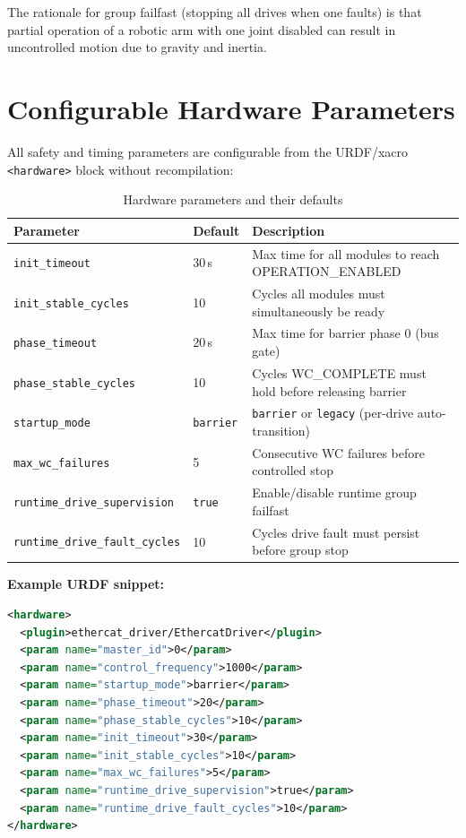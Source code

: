 \documentclass[11pt,a4paper]{article}
\begin{document}
The rationale for group failfast (stopping all drives when one faults) is
that partial operation of a robotic arm with one joint disabled can result in
uncontrolled motion due to gravity and inertia.

\section{Configurable Hardware Parameters}
\label{sec:params}

All safety and timing parameters are configurable from the URDF/xacro
\texttt{<hardware>} block without recompilation:

\begin{table}[H]
  \centering
  \caption{Hardware parameters and their defaults}
  \label{tab:params}
  \small
  \begin{tabularx}{\textwidth}{@{}l l X@{}}
    \toprule
    Parameter & Default & Description \\
    \midrule
    \texttt{init\_timeout} & 30\,s &
      Max time for all modules to reach OPERATION\_ENABLED \\
    \texttt{init\_stable\_cycles} & 10 &
      Cycles all modules must simultaneously be ready \\
    \texttt{phase\_timeout} & 20\,s &
      Max time for barrier phase 0 (bus gate) \\
    \texttt{phase\_stable\_cycles} & 10 &
      Cycles WC\_COMPLETE must hold before releasing barrier \\
    \texttt{startup\_mode} & \texttt{barrier} &
      \texttt{barrier} or \texttt{legacy} (per-drive auto-transition) \\
    \texttt{max\_wc\_failures} & 5 &
      Consecutive WC failures before controlled stop \\
    \texttt{runtime\_drive\_supervision} & \texttt{true} &
      Enable/disable runtime group failfast \\
    \texttt{runtime\_drive\_fault\_cycles} & 10 &
      Cycles drive fault must persist before group stop \\
    \bottomrule
  \end{tabularx}
\end{table}

\textbf{Example URDF snippet:}
\begin{lstlisting}[language=XML,caption={Hardware parameters in URDF}]
<hardware>
  <plugin>ethercat_driver/EthercatDriver</plugin>
  <param name="master_id">0</param>
  <param name="control_frequency">1000</param>
  <param name="startup_mode">barrier</param>
  <param name="phase_timeout">20</param>
  <param name="phase_stable_cycles">10</param>
  <param name="init_timeout">30</param>
  <param name="init_stable_cycles">10</param>
  <param name="max_wc_failures">5</param>
  <param name="runtime_drive_supervision">true</param>
  <param name="runtime_drive_fault_cycles">10</param>
</hardware>
\end{lstlisting}
\end{document}
